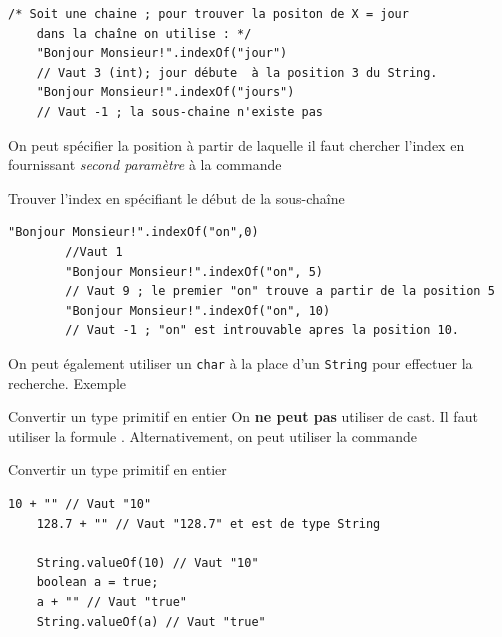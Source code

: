 \documentclass{report}
\begin{document}
\begin{EExample*}{}{}
\begin{lstlisting}[style=JavaDraculaWhite]
	/* Soit une chaine ; pour trouver la positon de X = jour
	dans la chaîne on utilise : */
	"Bonjour Monsieur!".indexOf("jour") 
	// Vaut 3 (int); jour débute  à la position 3 du String.
	"Bonjour Monsieur!".indexOf("jours")
	// Vaut -1 ; la sous-chaine n'existe pas
\end{lstlisting}
\end{EExample*}

\begin{note}
On peut spécifier la position à partir de laquelle il faut chercher l'index en fournissant \textit{second paramètre} à la commande 
\end{note}

\begin{EExample*}{Trouver l'index en spécifiant le début de la sous-chaîne}{}
	\begin{lstlisting}[style=JavaDraculaWhite]
		"Bonjour Monsieur!".indexOf("on",0)
		//Vaut 1
		"Bonjour Monsieur!".indexOf("on", 5) 
		// Vaut 9 ; le premier "on" trouve a partir de la position 5
		"Bonjour Monsieur!".indexOf("on", 10) 
		// Vaut -1 ; "on" est introuvable apres la position 10.
	\end{lstlisting}
\end{EExample*}

\begin{note}
On peut également utiliser un \texttt{\footnotesize{char}} 
à la place d'un \texttt{\footnotesize{String}} pour
effectuer la recherche. Exemple 
\end{note}

\begin{Syntaxe*}{Convertir un type primitif en entier}{}
On \textbf{ne peut pas} utiliser de cast. Il faut utiliser la formule . 
Alternativement, on peut utiliser la commande 
\end{Syntaxe*}

\begin{EExample*}{Convertir un type primitif en entier}{}
\begin{lstlisting}[style=JavaDraculaWhite]
	10 + "" // Vaut "10"
	128.7 + "" // Vaut "128.7" et est de type String

	String.valueOf(10) // Vaut "10"
	boolean a = true;
	a + "" // Vaut "true"
	String.valueOf(a) // Vaut "true"
\end{lstlisting}
\end{EExample*}
\end{document}
